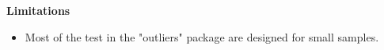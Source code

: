 \documentclass[a4paper,12pt]{article}
\begin{document}



\Large
\textbf{Limitations}
\begin{itemize}
	\item Most of the test in the "outliers" package are designed for small samples. 
\end{itemize}
\end{document}
